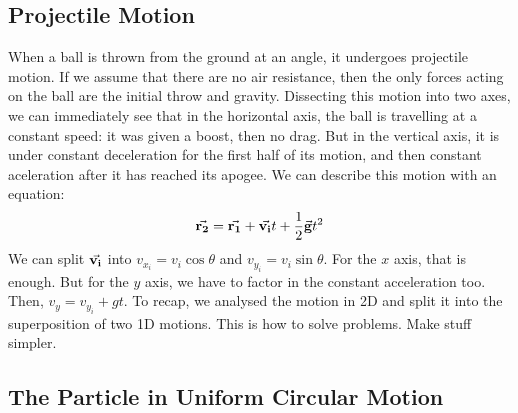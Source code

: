 \documentclass[12pt]{article}
\begin{document}
    \subsection*{Projectile Motion}
    When a ball is thrown from the ground at an angle, it undergoes projectile motion. If we assume that there are no air resistance, then the only forces acting on the ball are the initial throw and gravity. Dissecting this motion into two axes, we can immediately see that in the horizontal axis, the ball is travelling at a constant speed: it was given a boost, then no drag. But in the vertical axis, it is under constant deceleration for the first half of its motion, and then constant aceleration after it has reached its apogee. We can describe this motion with an equation:
    \begin{equation}
        \vec{\mathbf{r_2}} = \vec{\mathbf{r_1}} + \vec{\mathbf{v_i}}t + \dfrac{1}{2} \vec{\mathbf{g}} t^2
    \end{equation}
    We can split $\vec{\mathbf{v_i}}$ into $v_{x_i} = v_i \cos \theta$ and $v_{y_i} = v_i \sin \theta$. For the $x$ axis, that is enough. But for the $y$ axis, we have to factor in the constant acceleration too. Then, $v_y = v_{y_i} + gt$. To recap, we analysed the motion in 2D and split it into the superposition of two 1D motions. This is how to solve problems. Make stuff simpler.
    \subsection*{The Particle in Uniform Circular Motion}
\end{document}
